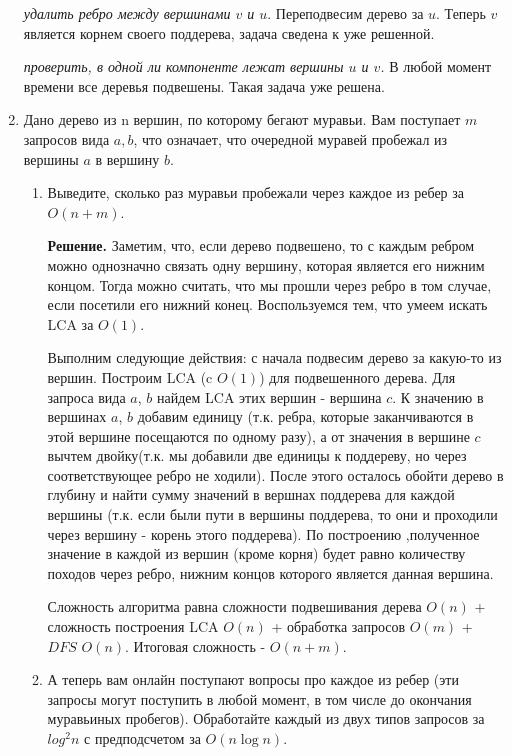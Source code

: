 \begin{enumerate}
	\textit{удалить ребро между вершинами $v$ и $u$}. Переподвесим дерево за $u$. Теперь $v$ 
	является корнем своего поддерева, задача сведена к уже решенной.
	
	\textit{проверить, в одной ли компоненте лежат вершины $u$ и $v$.} В любой момент времени 
	все деревья подвешены. Такая задача уже решена.
	
	
	\item Дано дерево из n вершин, по которому бегают муравьи. Вам поступает $m$
	запросов вида $a, b$, что означает, что очередной муравей пробежал из вершины $a$ в вершину 
	$b$.
	
	\begin{enumerate}
		\item Выведите, сколько раз муравьи пробежали через каждое из ребер за $O(n + m)$.
		
		\textbf{Решение. } Заметим, что, если дерево подвешено, то с каждым ребром можно 
		однозначно связать одну вершину, которая является его нижним концом. Тогда можно 
		считать, что мы прошли через ребро в том случае, если посетили его нижний конец. 
		Воспользуемся тем, что умеем искать LCA за $O(1)$. 
		
		Выполним следующие действия: с начала подвесим дерево за какую-то из вершин. Построим 
		LCA (c $O(1)$) для подвешенного дерева. Для запроса вида $a$, $b$ найдем LCA этих 
		вершин - вершина $c$. К значению в вершинах $a$, $b$ добавим единицу (т.к. ребра, 
		которые заканчиваются в этой вершине посещаются по одному разу), а от значения в 
		вершине $c$ вычтем двойку(т.к. мы добавили две единицы к поддереву, но через 
		соответствующее ребро не ходили). После этого осталось обойти дерево в глубину и найти 
		сумму значений в вершнах поддерева для каждой вершины (т.к. если были пути в вершины 
		поддерева, то они и проходили через вершину - корень этого поддерева). По построению 
		,полученное значение в каждой из вершин (кроме корня) будет равно количеству походов 
		через ребро, 
		нижним концов которого является данная вершина.
		
		Сложность алгоритма равна сложности подвешивания дерева $O(n)$ + сложность построения 
		LCA $O(n)$ + обработка запросов $O(m)$ + $DFS$ $O(n)$. Итоговая сложность - $O(n + m)$.
	
		\item А теперь вам онлайн поступают вопросы про каждое из ребер (эти запросы могут 
		поступить в любой момент, в том числе до окончания муравьиных пробегов). Обработайте 
		каждый из двух типов запросов за $log^2 n$ с предподсчетом за $O(n \log n)$.
		
	\end{enumerate}
		
		
\end{enumerate}


